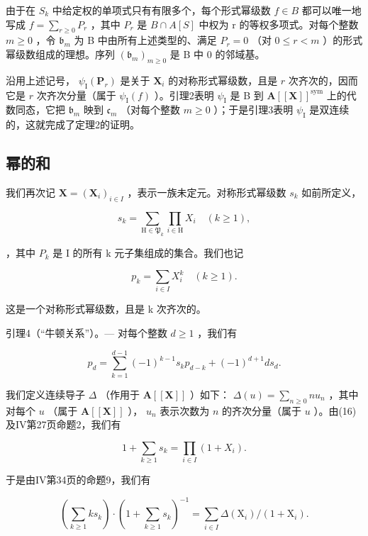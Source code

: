由于在 \(S_{k}\) 中给定权的单项式只有有限多个，每个形式幂级数 \(f \in B\) 都可以唯一地写成 \(f = \sum_{r \geqslant 0} P_{r}\) ，其中 \(P_{r}\) 是 \(B \cap A[S]\) 中权为 r 的等权多项式。对每个整数 \(m \geqslant 0\) ，令 \(\mathfrak{b}_m\) 为 B 中由所有上述类型的、满足 \(P_r = 0\) （对 \(0 \leqslant r < m\) ）的形式幂级数组成的理想。序列 \((\mathfrak{b}_m)_{m \geqslant 0}\) 是 B 中 0 的邻域基。

沿用上述记号， \(\psi_{\mathrm{I}}(\mathbf{P}_{r})\) 是关于 \(\mathbf{X}_i\) 的对称形式幂级数，且是 \(r\) 次齐次的，因而它是 \(r\) 次齐次分量（属于 \(\psi_{\mathrm{I}}(f)\) ）。引理2表明 \(\psi_{\mathrm{I}}\) 是 B 到 \(\mathbf{A}[[\mathbf{X}]]^{\mathrm{sym}}\) 上的代数同态，它把 \(\mathfrak{b}_m\) 映到 \(\mathfrak{c}_m\) （对每个整数 \(m \geqslant 0\) ）；于是引理3表明 \(\psi_{\mathrm{I}}\) 是双连续的，这就完成了定理2的证明。

\subsection{幂的和}

我们再次记 \(\mathbf{X} = (\mathbf{X}_{i})_{i \in I}\) ，表示一族未定元。对称形式幂级数 \(s_{k}\) 如前所定义，

\[
s _ {k} = \sum_ {\mathrm{H} \in \mathfrak {P} _ {k}} \prod_ {i \in \mathrm{H}} X _ {i} \quad (k \geqslant 1),\tag{16}
\]

，其中 \(P_{k}\) 是 I 的所有 k 元子集组成的集合。我们也记

\[
p _ {k} = \sum_ {i \in I} X _ {i} ^ {k} \quad (k \geqslant 1).\tag{17}
\]

这是一个对称形式幂级数，且是 k 次齐次的。

引理4（“牛顿关系”）。--- 对每个整数 \(d \geqslant 1\) ，我们有

\[
p _ {d} = \sum_ {k = 1} ^ {d - 1} (- 1) ^ {k - 1} s _ {k} p _ {d - k} + (- 1) ^ {d + 1} d s _ {d}.\tag{18}
\]

我们定义连续导子 \(\Delta\) （作用于 \(\mathbf{A}[[\mathbf{X}]]\) ）如下： \(\Delta(u) = \sum_{n \geq 0} nu_n\) ，其中对每个 \(u\) （属于 \(\mathbf{A}[[\mathbf{X}]]\) ）， \(u_n\) 表示次数为 \(n\) 的齐次分量（属于 \(u\) ）。由(16)及IV第27页命题2，我们有

\[
1 + \sum_ {k \geqslant 1} s _ {k} = \prod_ {i \in I} (1 + X _ {i}).\tag{19}
\]

于是由IV第34页的命题9，我们有

\[
\left(\sum_ {k \geqslant 1} k s _ {k}\right) \cdot \left(1 + \sum_ {k \geqslant 1} s _ {k}\right) ^ {- 1} = \sum_ {i \in I} \Delta \left(\mathrm{X} _ {i}\right) / \left(1 + \mathrm{X} _ {i}\right).\tag{20}
\]

